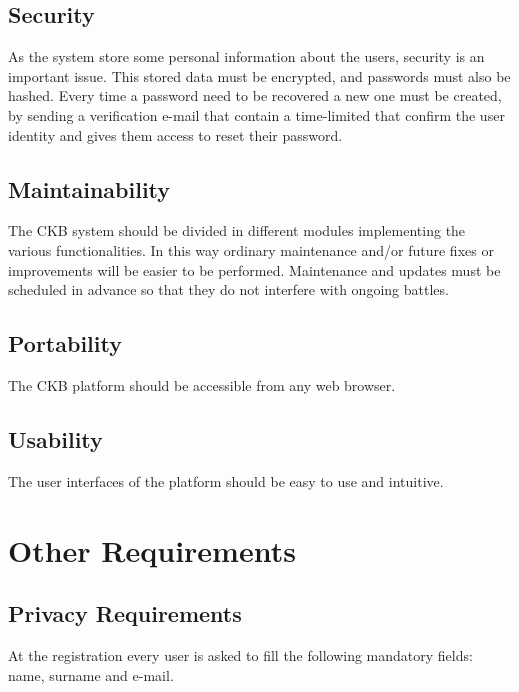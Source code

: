 \subsection{Security}
As the system store some personal information about the users, security is an important issue. This stored data must be encrypted, and passwords must also be hashed. \newline
Every time a password need to be recovered a new one must be created, by sending a verification e-mail that contain a time-limited that confirm the user identity and gives them access to reset their password.
\subsection{Maintainability}
The CKB system should be divided in different modules implementing the various functionalities. In this way ordinary maintenance and/or future fixes or improvements will be easier to be performed. \newline
Maintenance and updates must be scheduled in advance so that they do not interfere with ongoing battles. 
\subsection{Portability}
The CKB platform should be accessible from any web browser.
\subsection{Usability}
The user interfaces of the platform should be easy to use and intuitive.

\section{Other Requirements}
\subsection{Privacy Requirements}
At the registration every user is asked to fill the following mandatory fields:
name, surname and e-mail. 
